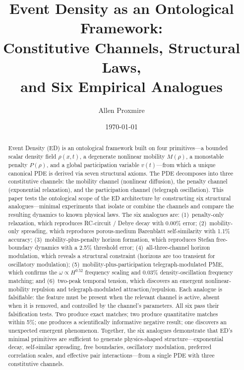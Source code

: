 \documentclass[11pt]{article}
\title{Event Density as an Ontological Framework:\\
Constitutive Channels, Structural Laws,\\and Six Empirical Analogues}
\author{Allen Proxmire}
\date{\today}
\begin{document}
\maketitle
\tableofcontents
\newpage

\begin{abstract}
Event Density (ED) is an ontological framework built on four primitives---a bounded scalar density field \(\rho(x,t)\), a degenerate nonlinear mobility \(M(\rho)\), a monostable penalty \(P(\rho)\), and a global participation variable \(v(t)\)---from which a unique canonical PDE is derived via seven structural axioms. The PDE decomposes into three constitutive channels: the mobility channel (nonlinear diffusion), the penalty channel (exponential relaxation), and the participation channel (telegraph oscillation). This paper tests the ontological scope of the ED architecture by constructing six structural analogues---minimal experiments that isolate or combine the channels and compare the resulting dynamics to known physical laws. The six analogues are: (1)~penalty-only relaxation, which reproduces RC-circuit / Debye decay with 0.00\% error; (2)~mobility-only spreading, which reproduces porous-medium Barenblatt self-similarity with 1.1\% accuracy; (3)~mobility-plus-penalty horizon formation, which reproduces Stefan free-boundary dynamics with a 2.5\% threshold error; (4)~all-three-channel horizon modulation, which reveals a structural constraint (horizons are too transient for oscillatory modulation); (5)~mobility-plus-participation telegraph-modulated PME, which confirms the \(\omega \propto H^{0.52}\) frequency scaling and 0.03\% density-oscillation frequency matching; and (6)~two-peak temporal tension, which discovers an emergent nonlinear-mobility repulsion and telegraph-modulated attraction/repulsion. Each analogue is falsifiable: the feature must be present when the relevant channel is active, absent when it is removed, and controlled by the channel's parameters. All six pass their falsification tests. Two produce exact matches; two produce quantitative matches within 5\%; one produces a scientifically informative negative result; one discovers an unexpected emergent phenomenon. Together, the six analogues demonstrate that ED's minimal primitives are sufficient to generate physics-shaped structure---exponential decay, self-similar spreading, free boundaries, oscillatory modulation, preferred correlation scales, and effective pair interactions---from a single PDE with three constitutive channels.
\end{abstract}
\end{document}
